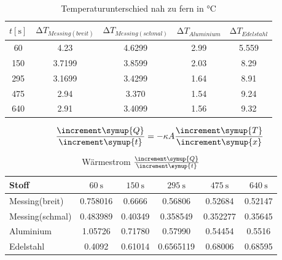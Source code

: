 \begin{table}
    \centering
    \caption{Temperaturunterschied nah zu fern in $\si{\celsius}$}
    \label{tab:tempdiff_5_messwerte}
    \begin{tabular}{S[table-format=3, round-mode=places, round-precision=1] S[table-format=1.2, round-mode=places, round-precision=2] S[table-format=1.2, round-mode=places, round-precision=2] S[table-format=1.2, round-mode=places, round-precision=2] S[table-format=1.2, round-mode=places, round-precision=2]}
        \toprule
        {$t[\si{\s}]$} & {$\increment T_{Messing(breit)}$} & {$\increment T_{Messing(schmal)}$} & {$\increment T_{Aluminium}$} & {$\increment T_{Edelstahl}$} \\
          & 4.23   & 4.6299 & 2.99 &	5.559 \\
        150 & 3.7199 & 3.8599 & 2.03 &	8.29 \\
        295 & 3.1699 & 3.4299 & 1.64 &	8.91 \\
        475 & 2.94   & 3.370  & 1.54 &	9.24 \\
        640 & 2.91   & 3.4099 & 1.56 &	9.32 \\
        \bottomrule
    \end{tabular}
\end{table}

\begin{equation}
    \frac{\increment \symup{Q}}{\increment \symup{t}} = -\kappa A \frac{\increment \symup{T}}{\increment \symup{x}}
\end{equation}

\begin{table}
    \centering
    \caption{Wärmestrom $\frac{\increment \symup{Q}}{\increment \symup{t}}$}
    \label{tab:Warmestrom}
    \begin{tabular}{l | S[round-mode=places, round-precision=4] S[round-mode=places, round-precision=4] S[round-mode=places, round-precision=4] S[round-mode=places, round-precision=4] S[round-mode=places, round-precision=4]}
        \toprule
        {Stoff} & {$\SI{60}{\s}$} & {$\SI{150}{\s}$} & {$\SI{295}{\s}$} & {$\SI{475}{\s}$} & {$\SI{640}{\s}$} \\
        \midrule
        Messing(breit)      & 0.758016    & 0.6666  & 0.56806 & 0.52684   & 0.52147   \\
        Messing(schmal)     & 0.483989  & 0.40349 & 0.358549 & 0.352277 & 0.35645 \\
        Aluminium           & 1.05726    & 0.71780   & 0.57990   & 0.54454   & 0.5516   \\
        Edelstahl           & 0.4092   & 0.61014  & 0.6565119 & 0.68006   & 0.68595   \\
        \bottomrule
    \end{tabular}
\end{table}

